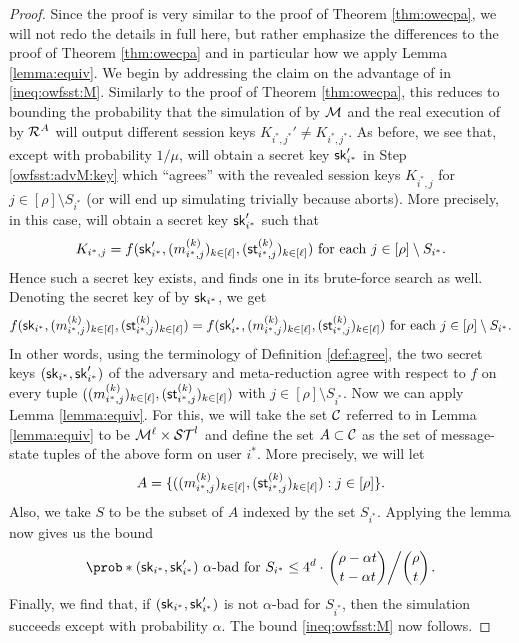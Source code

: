 \begin{proof}
  Since the proof is very similar to the proof of Theorem \ref{thm:owecpa},
  we will not redo the details in full here,
  but rather emphasize the differences to the proof of Theorem \ref{thm:owecpa}
  and in particular how we apply Lemma \ref{lemma:equiv}.
  We begin by addressing the claim on the advantage of \redM in \eqref{ineq:owfsst:M}.
  Similarly to the proof of Theorem \ref{thm:owecpa},
  this reduces to bounding the probability that the simulation of \advA by \(\mathcal{M}\)
  and the real execution of \advA by \(\redR^{A}\) will output different session keys
  \(K_{i^{*},j^{*}}' \ne K_{i^{*},j^{*}}\).
  As before, we see that, except with probability \(1/\mu\),
  \redM will obtain a secret key \(\mathsf{sk}_{i^{*}}'\) in Step \ref{owfsst:advM:key}
  which ``agrees'' with the revealed session keys \(K_{i^{*},j}\) for \(j \in [\rho] \setminus S_{i^{*}}\)
  (or \redM will end up simulating \advA trivially because \advA aborts).
  More precisely, in this case, \redM will obtain a secret key \(\mathsf{sk}_{i^{*}}'\) such that
  \[
    K_{i^{*},j} = f(\mathsf{sk}_{i^{*}}',(m_{i^{*},j}^{(k)})_{k \in [\ell]},(\mathsf{st}_{i^{*},j}^{(k)})_{k \in [\ell]})
    \text{ for each } j \in [\rho] \setminus S_{i^{*}}.
  \]
  Hence such a secret key exists, and \advA finds one in its brute-force search as well.
  Denoting the secret key of \advA by \(\mathsf{sk}_{i^{*}}\), we get
  \[
    f(\mathsf{sk}_{i^{*}},(m_{i^{*},j}^{(k)})_{k \in [\ell]},(\mathsf{st}_{i^{*},j}^{(k)})_{k \in [\ell]})
    = f(\mathsf{sk}_{i^{*}}',(m_{i^{*},j}^{(k)})_{k \in [\ell]},(\mathsf{st}_{i^{*},j}^{(k)})_{k \in [\ell]})
    \text{ for each } j \in [\rho] \setminus S_{i^{*}}.
  \]
  In other words, using the terminology of Definition \ref{def:agree},
  the two secret keys \((\mathsf{sk}_{i^{*}},\mathsf{sk}_{i^{*}}')\) of the adversary \advA and meta-reduction \redM
  agree with respect to \(f\) on every tuple
  \(((m_{i^{*},j}^{(k)})_{k \in [\ell]},(\mathsf{st}_{i^{*},j}^{(k)})_{k \in [\ell]})\) with \(j \in [\rho] \setminus S_{i^{*}}\).
  Now we can apply Lemma \ref{lemma:equiv}.
  For this, we will take the set \(\mathcal{C}\) referred to in Lemma \ref{lemma:equiv}
  to be \(\mathcal{M}^{\ell} \times \mathcal{ST}^{l}\)
  and define the set \(A \subset \mathcal{C}\) as the set of message-state tuples of the above form on user \(i^{*}\).
  More precisely, we will let
  \[
    A =
    \{
    ((m_{i^{*},j}^{(k)})_{k \in [\ell]},(\mathsf{st}_{i^{*},j}^{(k)})_{k \in [\ell]}) : j \in [\rho]
    \}.
  \]
  Also, we take \(S\) to be the subset of \(A\) indexed by the set \(S_{i^{*}}\).
  Applying the lemma now gives us the bound
  \[
    \prob*{(\sk_{i^{*}},\sk_{i^{*}}') \text{ \(\alpha\)-bad for } S_{i^{*}}}
    \le 4^{d} \cdot \left. \binom{\rho - \alpha t}{t - \alpha t} \middle/ \binom{\rho}{t} \right..
  \]
  Finally, we find that, if \((\mathsf{sk}_{i^{*}},\mathsf{sk}_{i^{*}}')\) is not \(\alpha\)-bad for \(S_{i^{*}}\),
  then the simulation succeeds except with probability \(\alpha\).
  The bound \eqref{ineq:owfsst:M} now follows.


\end{proof}
